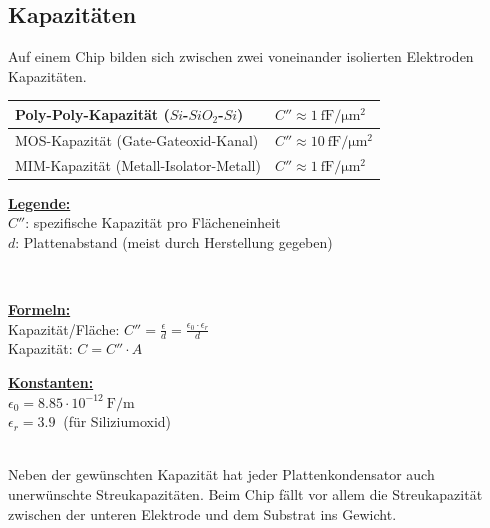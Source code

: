 \subsection{Kapazitäten}
Auf einem Chip bilden sich zwischen zwei voneinander isolierten Elektroden Kapazitäten.
\\[2ex]
\begin{minipage}[c]{0.55\textwidth}
	\begin{tabular}{|l|l|}
		\hline
		Poly-Poly-Kapazität ($Si$-$SiO_2$-$Si$) & $C'' \approx \SI{1}{\femto \farad \per \micro \meter ^2}$\\ \hline
		MOS-Kapazität (Gate-Gateoxid-Kanal) & $C'' \approx \SI{10}{\femto \farad \per \micro \meter ^2}$\\ \hline
		MIM-Kapazität (Metall-Isolator-Metall) & $C'' \approx \SI{1}{\femto \farad \per \micro \meter ^2}$ \\ \hline
	\end{tabular}
\end{minipage}
\begin{minipage}[c]{0.45\textwidth}
	\uline{\textbf{Legende:}}\\
	$C''$: spezifische Kapazität pro Flächeneinheit\\
	$d$:   Plattenabstand (meist durch Herstellung gegeben)
\end{minipage}
\\[2ex]
\begin{minipage}[c]{0.55\textwidth}
	\uline{\textbf{Formeln:}}\\
	Kapazität/Fläche: $C'' = \frac{\epsilon}{d} = \frac{\epsilon_0 \cdot \epsilon_r}{d}$\\
	Kapazität: \hspace{11.5mm}$C = C'' \cdot A$
\end{minipage}
\begin{minipage}[c]{0.45\textwidth}
	\uline{\textbf{Konstanten:}}\\
	$\epsilon_0 = 8.85 \cdot 10^{-12} \SI{}{\farad / \meter}$\\
	$\epsilon_r = \SI{3.9}{}$ (für Siliziumoxid)
\end{minipage}
\\[2ex]
Neben der gewünschten Kapazität hat jeder Plattenkondensator auch unerwünschte Streukapazitäten. 
Beim Chip fällt vor allem die Streukapazität zwischen der unteren Elektrode und dem Substrat ins Gewicht.

